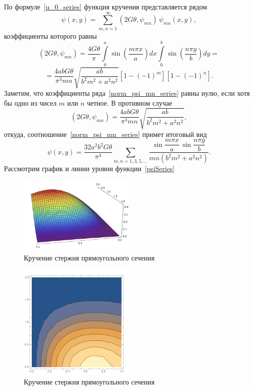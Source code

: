 \documentclass[12pt, a4paper]{article}
\begin{document}
По формуле~\eqref{u_0_series} функция кручения представляется рядом
\begin{equation}  \label{norm_psi_mn_series}
	\psi(x, y) = \sum_{m, n = 1}^\infty (2G \theta, \psi_{mn}) \, \psi_{mn}(x, y),
\end{equation}
коэффициенты которого равны
\[
(2G \theta, \psi_{mn}) = \frac{4 G \theta}{\pi}\int\limits_0^a \sin\left(\frac{m \pi x}{a}\right) dx \int\limits_0^b
\sin\left(\frac{n \pi y}{b}\right) dy = 
\]
\[
	= \frac{4abG\theta}{\pi^3 mn} \sqrt{\frac{ab}{b^2 m^2 + a^2 n^2}}[1 - (-1)^m][1 - (-1)^n].
\]
Заметим, что коэффициенты ряда~\eqref{norm_psi_mn_series} равны нулю, если
хотя бы одно из чисел $m$ или $n$ четное. В противном случае
\[
(2G \theta, \psi_{mn}) = \frac{4abG\theta}{\pi^3 mn} \sqrt{\frac{ab}{b^2 m^2 + a^2 n^2}},
\]
откуда, соотношение~\eqref{norm_psi_mn_series} примет итоговый вид
\begin{equation}  \label{psiSeries}
	\psi(x, y) = \frac{32 a^2 b^2 G\theta}{\pi^4} \!\!\! \sum_{m, n = 1, 3, 5, \ldots}
	\!\!\! \frac{\sin\dfrac{m\pi x}{a} \, \sin\dfrac{n\pi y}{b}}{mn(b^2 m^2 + a^2 n^2)}.
\end{equation}
Рассмотрим график и линии уровни функции~\eqref{psiSeries}
\begin{figure}[!h]
	\centering
	\includegraphics[width=0.5\textwidth]{ser_graph}%
	\caption{Кручение стержня прямоугольного сечения}
	\vspace*{-2mm}
	\label{pic1}
\end{figure}
\begin{figure}[!h]
	\centering
	\includegraphics[width=0.5\textwidth]{ser_levels}%
	\caption{Кручение стержня прямоугольного сечения}
	\vspace*{-2mm}
	\label{pic1}
\end{figure}
\end{document}
